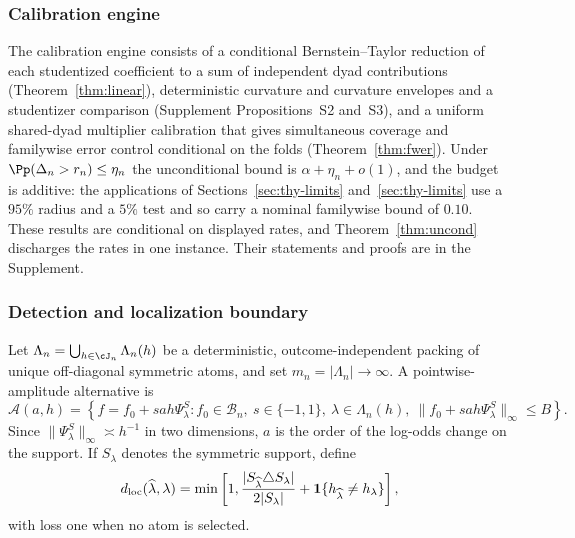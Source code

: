\documentclass[11pt]{article}
\theoremstyle{definition}
\newcommand{\1}{\mathbf 1}\newcommand{\op}{\operatorname}
\newcommand{\cA}{\mathcal A}\newcommand{\cG}{\mathcal G}\newcommand{\suppsec}[2]{Appendix~\ref{#2}}
\begin{document}
\subsubsection{Calibration engine}                                  \label{sec:engine}

The calibration engine consists of a conditional Bernstein--Taylor reduction
of each studentized coefficient to a sum of independent dyad contributions
(Theorem~\ref{thm:linear}), deterministic curvature and curvature envelopes and a
studentizer comparison (Supplement Propositions~S2 and~S3), and a uniform
shared-dyad multiplier calibration that gives simultaneous coverage and
familywise error control conditional on the folds (Theorem~\ref{thm:fwer}).
Under $\Pp(\Delta_n>r_n)\le\eta_n$ the unconditional bound is
$\alpha+\eta_n+o(1)$, and the budget is additive: the applications of
Sections~\ref{sec:thy-limits} and~\ref{sec:thy-limits} use a $95\%$ radius and a $5\%$
test and so carry a nominal familywise bound of $0.10$.  These results are
conditional on displayed rates, and Theorem~\ref{thm:uncond} discharges the
rates in one instance.  Their statements and proofs are in the Supplement.

\subsubsection{Detection and localization boundary}

Let $\Lambda_n=\bigcup_{h\in\cJ_n}\Lambda_n(h)$ be a deterministic,
outcome-independent packing of unique off-diagonal symmetric atoms, and set
$m_n=|\Lambda_n|\to\infty$.  A pointwise-amplitude alternative is
\begin{equation}
 \cA(a,h)=
 \left\{f=f_0+sah\Psi_\lambda^S:
 f_0\in\mathcal B_n,\ s\in\{-1,1\},\ \lambda\in\Lambda_n(h),\
 \|f_0+sah\Psi_\lambda^S\|_\infty\le B\right\}.               \label{eq:altclass}
\end{equation}
Since $\|\Psi_\lambda^S\|_\infty\asymp h^{-1}$ in two dimensions, $a$ is the
order of the log-odds change on the support.  If $S_\lambda$ denotes the symmetric
support, define
\begin{equation}
 d_{\rm loc}(\widehat\lambda,\lambda)
 =\min\left[1,
 \frac{|S_{\widehat\lambda}\triangle S_\lambda|}{2|S_\lambda|}
 +\1\{h_{\widehat\lambda}\ne h_\lambda\}\right],               \label{eq:locloss}
\end{equation}
with loss one when no atom is selected.
\end{document}
